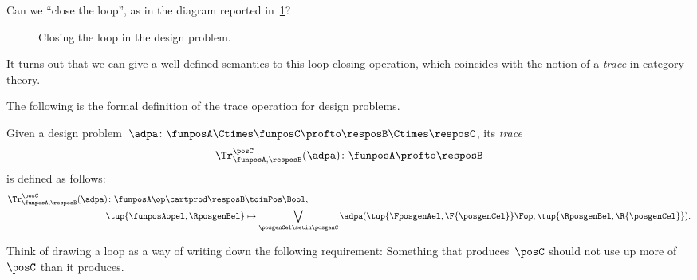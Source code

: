 Can we ``close the loop'', as in the diagram reported in~\cref{fig:extrace_2}?
\begin{figure}[h!]
    \centering
    \caption{Closing the loop in the design problem.
    }
    \label{fig:extrace_2}
\end{figure}

It turns out that we can give a well-defined semantics to this loop-closing operation, which coincides with the notion of a \emph{trace} in category theory.

The following is the formal definition of the trace operation for design problems.

\begin{definition}
    \label{def:dp-trace}
    Given a design problem~$\adpa\colon  \funposA \Ctimes \funposC \profto \resposB \Ctimes \resposC$, its \emph{trace}
    \begin{equation}
        \Tr_{\funposA,\resposB}^\posC(\adpa) \colon \funposA \profto \resposB
    \end{equation}
    is defined as follows:
    \begin{equation}
        \label{eq:tracedef}
        \begin{aligned}
            \Tr_{\funposA,\resposB}^\posC(\adpa) \colon  \funposA\op \cartprod \resposB & \toinPos \Bool, \\
            \tup{\funposAopel, \RposgenBel}                                             & \mapsto \bigvee_{\posgenCel \setin \posgenC}
            \adpa(\tup{\FposgenAel, \F{\posgenCel}}\Fop,
            \tup{\RposgenBel, \R{\posgenCel}}).
        \end{aligned}
    \end{equation}
\end{definition}

Think of drawing a loop as a way of writing down the following requirement:
Something that produces~$\posC$ should not use up more of~$\posC$ than it produces.

